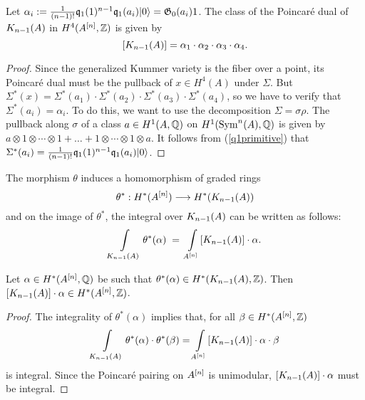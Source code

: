 \begin{proposition}
Let $\alpha_i := \frac{1}{(n-1)!}\kq_{1}(1)^{n-1}\kq_1(a_i)\vac = \G_0(a_i)1$. The class of the Poincar\'e dual of $\kum{A}{n-1}$ in $H^4(A\hilb{n},\Z)$ is given by
$$
[\kum{A}{n-1}]=\alpha_1\cdot\alpha_2\cdot\alpha_3\cdot\alpha_4.
$$ 
\end{proposition}
\begin{proof}
Since the generalized Kummer variety is the fiber over a point, its Poincar\'e dual must be the pullback of $x\in H^4(A)$ under $\Sigma$. But $\Sigma^* (x) = \Sigma^*(a_1)\cdot \Sigma^*(a_2)\cdot \Sigma^*(a_3)\cdot \Sigma^*(a_4)$, so we have to verify that $\Sigma^* (a_i) = \alpha_i$. To do this, we want to use the decomposition $\Sigma = \sigma\rho$.
The pullback along $\sigma$ of a class $a\in H^1(A,\Q)$ on $H^1(\Sym^n(A),\Q)$ 
is given by $a\otimes 1\otimes \cdots\otimes 1 + \ldots + 1\otimes \cdots\otimes 1\otimes a$. It follows from (\ref{q1primitive}) that $\Sigma^* (a_i) = \frac{1}{(n-1)!}\kq_{1}(1)^{n-1}\kq_1(a_i)\vac $.
\end{proof}
The morphism $\theta$ induces a homomorphism of graded rings
\begin{equation}
\theta^* :H^*(A\hilb{n})\longrightarrow H^*(\kum{A}{n-1})
\end{equation}
and on the image of $\theta^*$, the integral over $\kum{A}{n-1}$ can be written as follows:
\begin{equation}
\int\limits_{\kum{A}{n-1}}\theta^*(\alpha)\; =\; \int\limits_{A\hilb{n}} [\kum{A}{n-1}]\cdot\alpha .
\end{equation}
\begin{lemma}\label{IntegralityCheck}
Let $\alpha\in H^*(A\hilb{n},\Q)$ be such that $\theta^*(\alpha)\in  H^*(\kum{A}{n-1},\Z)$. Then $[\kum{A}{n-1}]\cdot\alpha \in H^*(A\hilb{n},\Z)$. 
\end{lemma}
\begin{proof}
The integrality of $\theta^*(\alpha)$ implies that, for all $\beta \in H^*(A\hilb{n},\Z)$
$$
\int\limits_{\kum{A}{n-1}} \theta^*(\alpha)\cdot\theta^*(\beta) = \int\limits_{A\hilb{n}} [\kum{A}{n-1}]\cdot\alpha\cdot\beta
$$
is integral. Since the Poincar\'e pairing on $A\hilb{n}$ is unimodular, $[\kum{A}{n-1}]\cdot\alpha$ must be integral.
\end{proof}

